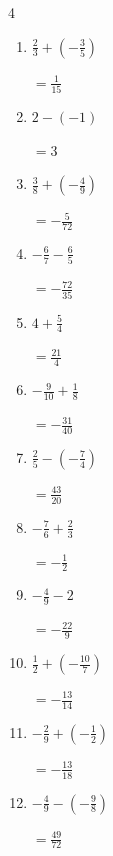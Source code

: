 \begin{multicols}{4}
\begin{enumerate}
  \item $\displaystyle \frac{2}{3} + \left(-\frac{3}{5}\right)$

        $\displaystyle =\frac{1}{15}$

  \item $\displaystyle 2 - \left(-1\right)$

        $\displaystyle =3$

  \item $\displaystyle \frac{3}{8} + \left(-\frac{4}{9}\right)$

        $\displaystyle =-\frac{5}{72}$

  \item $\displaystyle -\frac{6}{7} - \frac{6}{5}$

        $\displaystyle =-\frac{72}{35}$

\columnbreak %

  \item $\displaystyle 4 + \frac{5}{4}$

        $\displaystyle =\frac{21}{4}$

  \item $\displaystyle -\frac{9}{10} + \frac{1}{8}$

        $\displaystyle =-\frac{31}{40}$

  \item $\displaystyle \frac{2}{5} - \left(-\frac{7}{4}\right)$

        $\displaystyle =\frac{43}{20}$

  \item $\displaystyle -\frac{7}{6} + \frac{2}{3}$

        $\displaystyle =-\frac{1}{2}$

  \item $\displaystyle -\frac{4}{9} - 2$

        $\displaystyle =-\frac{22}{9}$

  \item $\displaystyle \frac{1}{2} + \left(-\frac{10}{7}\right)$

        $\displaystyle =-\frac{13}{14}$

  \item $\displaystyle -\frac{2}{9} + \left(-\frac{1}{2}\right)$

        $\displaystyle =-\frac{13}{18}$

  \item $\displaystyle -\frac{4}{9} - \left(-\frac{9}{8}\right)$

        $\displaystyle =\frac{49}{72}$


\end{enumerate}
\end{multicols}
